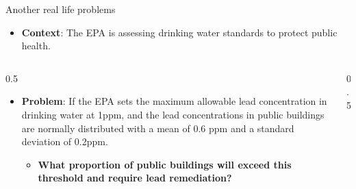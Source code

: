 \documentclass[
  ignorenonframetext,
]{beamer}
\providecommand{\tightlist}{%
  \setlength{\itemsep}{0pt}\setlength{\parskip}{0pt}}
\begin{document}
\begin{frame}{Another real life problems}
\label{another-real-life-problems-1}
\small

\begin{itemize}
\tightlist
\item
  \textbf{Context}: The EPA is assessing drinking water standards to
  protect public health.\\
\end{itemize}

\begin{columns}[T]
\begin{column}{0.5\linewidth}
\small

\begin{itemize}
\tightlist
\item
  \textbf{Problem}: If the EPA sets the maximum allowable lead
  concentration in drinking water at 1ppm, and the lead concentrations
  in public buildings are normally distributed with a mean of 0.6 ppm
  and a standard deviation of 0.2ppm.

  \begin{itemize}
  \tightlist
  \item
    \textbf{What proportion of public buildings will exceed this
    threshold and require lead remediation?}\\
  \end{itemize}
\end{itemize}

\vspace{1cm}
\end{column}

\begin{column}{0.5\linewidth}
\end{column}
\end{columns}
\end{frame}
\end{document}
